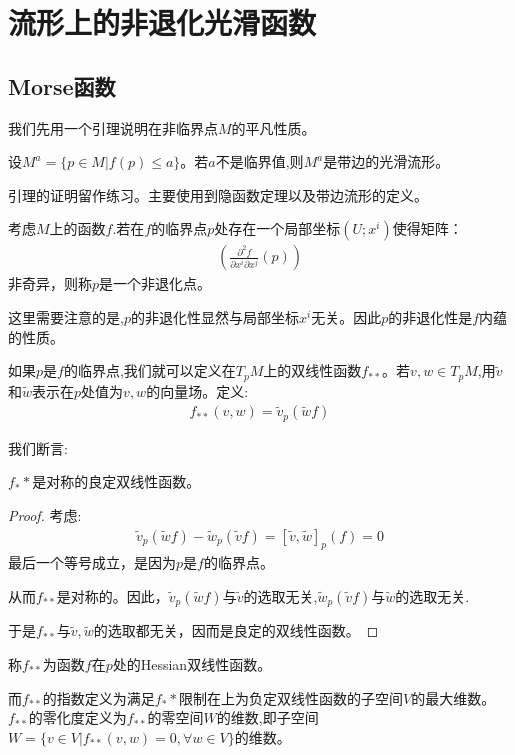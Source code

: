 \chapter{流形上的非退化光滑函数}
\section{Morse函数}
我们先用一个引理说明在非临界点$M$的平凡性质。
\begin{lemma}[非临界点]
	设$M^a=\{p\in M|f(p)\leq a\}$。若$a$不是临界值,则$M^a$是带边的光滑流形。
\end{lemma}

引理的证明留作练习。主要使用到隐函数定理以及带边流形的定义。

\begin{definition}[非退化点]
	考虑$M$上的函数$f$.若在$f$的临界点$p$处存在一个局部坐标$(U;x^i)$使得矩阵：
	\begin{align}\label{Hess}
		(\frac{\partial^2 f}{\partial x^i\partial x^j}(p))
	\end{align}
	非奇异，则称$p$是一个非退化点。
\end{definition}
这里需要注意的是,$p$的非退化性显然与局部坐标$x^i$无关。因此$p$的非退化性是$f$内蕴的性质。

如果$p$是$f$的临界点,我们就可以定义在$T_pM$上的双线性函数$f_{**}$。若$v,w \in T_pM$,用$\tilde{v}$和$\tilde{w}$表示在$p$处值为$v,w$的向量场。定义:
\begin{align}
	f_{**}(v,w)=\tilde{v}_p(\tilde{w}f)
\end{align}

我们断言:
\begin{lemma}
	$f_**$是对称的良定双线性函数。
\end{lemma}
\begin{proof}
	考虑:
	\begin{align}
		\tilde{v}_p(\tilde{w}f)-\tilde{w}_p(\tilde{v}f)=[\tilde{v},\tilde{w}]_p(f)=0
	\end{align}
	最后一个等号成立，是因为$p$是$f$的临界点。

	从而$f_{**}$是对称的。因此，$\tilde{v}_p(\tilde{w}f)$与$\tilde{v}$的选取无关,$\tilde{w}_p(\tilde{v}f)$与$\tilde{w}$的选取无关.

	于是$f_{**}$与$\tilde{v},\tilde{w}$的选取都无关，因而是良定的双线性函数。
\end{proof}
\begin{definition}
    \quad \quad 称$f_{**}$为函数$f$在$p$处的Hessian双线性函数。
	
	而$f_{**}$的指数定义为满足$f_**$限制在上为负定双线性函数的子空间$V$的最大维数。$f_{**}$的零化度定义为$f_{**}$的零空间$W$的维数,即子空间$W=\{v \in V|f_{**}(v,w)=0,\forall w\in V\}$的维数。
\end{definition}

